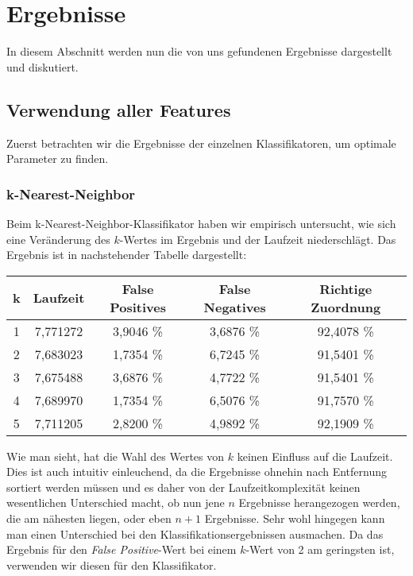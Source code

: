\chapter{Ergebnisse}
\label{ch:results}

In diesem Abschnitt werden nun die von uns gefundenen Ergebnisse dargestellt und diskutiert.

\section{Verwendung aller Features}

Zuerst betrachten wir die Ergebnisse der einzelnen Klassifikatoren, um optimale Parameter zu finden.

\subsection{k-Nearest-Neighbor}

Beim k-Nearest-Neighbor-Klassifikator haben wir empirisch untersucht, wie sich eine Veränderung des $k$-Wertes im Ergebnis und der Laufzeit niederschlägt. Das Ergebnis ist in nachstehender Tabelle dargestellt:

\begin{center}
	\begin{tabular}{ | c | c | c | c | c | }
		\hline
		\textbf{k} & \textbf{Laufzeit} & \textbf{False Positives} & \textbf{False Negatives} & Richtige Zuordnung \\ \hline
		1 & 7,771272 & 3,9046 \% & 3,6876 \% & 92,4078 \% \\ \hline
		2 & 7,683023 & 1,7354 \% & 6,7245 \% & 91,5401 \% \\ \hline
		3 & 7,675488 & 3,6876 \% & 4,7722 \% & 91,5401 \% \\ \hline
		4 & 7,689970 & 1,7354 \% & 6,5076 \% & 91,7570 \% \\ \hline
		5 & 7,711205 & 2,8200 \% & 4,9892 \% & 92,1909 \% \\ \hline
	\end{tabular}
\end{center}

Wie man sieht, hat die Wahl des Wertes von $k$ keinen Einfluss auf die Laufzeit. Dies ist auch intuitiv einleuchend, da die Ergebnisse ohnehin nach Entfernung sortiert werden müssen und es daher von der Laufzeitkomplexität keinen wesentlichen Unterschied macht, ob nun jene $n$ Ergebnisse herangezogen werden, die am nähesten liegen, oder eben $n+1$ Ergebnisse. Sehr wohl hingegen kann man einen Unterschied bei den Klassifikationsergebnissen ausmachen. Da das Ergebnis für den \textit{False Positive}-Wert bei einem $k$-Wert von 2 am geringsten ist, verwenden wir diesen für den Klassifikator.

